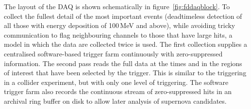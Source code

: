 The layout of the DAQ is shown schematically in
figure~\ref{fig:fddaqblock}.  To collect the fullest detail of the
most important events (deadtimeless detection of all those with energy
deposition of 100\,MeV and above), while avoiding tricky communication
to flag neighbouring channels to those that have large hits, a model
in which the data are collected twice is used.  The first collection
supplies a centralised software-based trigger farm continuously with zero-suppressed
information.  The second pass reads the full data at the times and in
the regions of interest that have been selected by the trigger. This
is similar to the triggering in a collider experiment, but with only
one level of triggering.  The software trigger farm also records the
continuous stream of zero-suppressed hits in an archival ring buffer
on disk to allow later analysis of supernova candidates.

